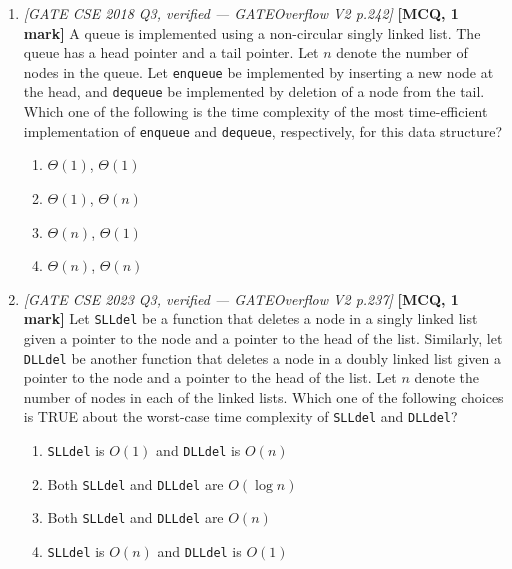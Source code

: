 \documentclass[11pt]{article}
\begin{document}
\begin{enumerate}
\item[\textbf{Q4}] \textit{[GATE CSE 2018 Q3, verified --- GATEOverflow V2 p.242]} \textbf{[MCQ, 1 mark]} A queue is implemented using a non-circular singly linked list. The queue has a head pointer and a tail pointer. Let $n$ denote the number of nodes in the queue. Let \texttt{enqueue} be implemented by inserting a new node at the head, and \texttt{dequeue} be implemented by deletion of a node from the tail. Which one of the following is the time complexity of the most time-efficient implementation of \texttt{enqueue} and \texttt{dequeue}, respectively, for this data structure?
\begin{enumerate}
  \item[(A)] $\Theta(1)$, $\Theta(1)$
  \item[(B)] $\Theta(1)$, $\Theta(n)$
  \item[(C)] $\Theta(n)$, $\Theta(1)$
  \item[(D)] $\Theta(n)$, $\Theta(n)$
\end{enumerate}

\item[\textbf{Q5}] \textit{[GATE CSE 2023 Q3, verified --- GATEOverflow V2 p.237]} \textbf{[MCQ, 1 mark]} Let \texttt{SLLdel} be a function that deletes a node in a singly linked list given a pointer to the node and a pointer to the head of the list. Similarly, let \texttt{DLLdel} be another function that deletes a node in a doubly linked list given a pointer to the node and a pointer to the head of the list. Let $n$ denote the number of nodes in each of the linked lists. Which one of the following choices is TRUE about the worst-case time complexity of \texttt{SLLdel} and \texttt{DLLdel}?
\begin{enumerate}
  \item[(A)] \texttt{SLLdel} is $O(1)$ and \texttt{DLLdel} is $O(n)$
  \item[(B)] Both \texttt{SLLdel} and \texttt{DLLdel} are $O(\log n)$
  \item[(C)] Both \texttt{SLLdel} and \texttt{DLLdel} are $O(n)$
  \item[(D)] \texttt{SLLdel} is $O(n)$ and \texttt{DLLdel} is $O(1)$
\end{enumerate}


\end{enumerate}
\end{document}
